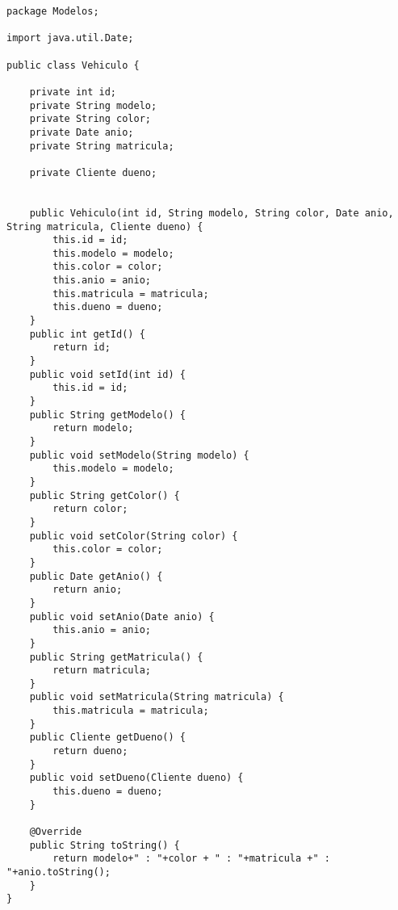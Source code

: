 \begin{lstlisting}[caption=Vehiculo.java (App Escritorio)]
package Modelos;

import java.util.Date;

public class Vehiculo {
	
	private int id;
	private String modelo;
	private String color;
	private Date anio;
	private String matricula;

	private Cliente dueno;
	
	
	public Vehiculo(int id, String modelo, String color, Date anio, String matricula, Cliente dueno) {
		this.id = id;
		this.modelo = modelo;
		this.color = color;
		this.anio = anio;
		this.matricula = matricula;
		this.dueno = dueno;
	}
	public int getId() {
		return id;
	}
	public void setId(int id) {
		this.id = id;
	}
	public String getModelo() {
		return modelo;
	}
	public void setModelo(String modelo) {
		this.modelo = modelo;
	}
	public String getColor() {
		return color;
	}
	public void setColor(String color) {
		this.color = color;
	}
	public Date getAnio() {
		return anio;
	}
	public void setAnio(Date anio) {
		this.anio = anio;
	}
	public String getMatricula() {
		return matricula;
	}
	public void setMatricula(String matricula) {
		this.matricula = matricula;
	}
	public Cliente getDueno() {
		return dueno;
	}
	public void setDueno(Cliente dueno) {
		this.dueno = dueno;
	}
	
	@Override
	public String toString() {
		return modelo+" : "+color + " : "+matricula +" : "+anio.toString();
	}	
}
\end{lstlisting}

\clearpage


